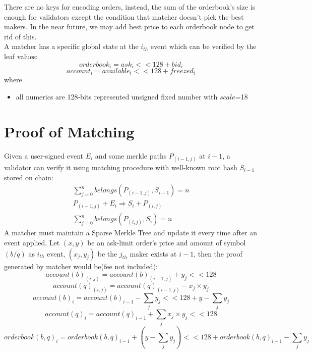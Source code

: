 \documentclass[a4paper,12pt]{article}
\begin{document}
There are no keys for encoding orders, instead, the sum of the orderbook's size is enough for validators except the condition that matcher doesn't pick the best makers. In the near future, we may add best price to each orderbook node to get rid of this.\\
A matcher has a specific global state at the \(i_{th}\) event which can be verified by the leaf values:\\
\begin{equation*}
    orderbook_{i} = ask_{i} << 128 + bid_{i}
\end{equation*}
\begin{equation*}
    account_{i} = available_{i} << 128 + freezed_{i}
\end{equation*}
where\\
\begin{itemize}
    \item all numerics are 128-bits represented unsigned fixed number with $scale$=18
\end{itemize}
\section{Proof of Matching}
\label{sec:org48d64ef}
Given a user-signed event \(E_{i}\) and some merkle paths \(P_{(i-1, j)}\) at \(i-1\), a validator can verify it using matching procedure with well-known root hash \(S_{i-1}\) stored on chain:\\
\begin{eqnarray*}
\sum\limits_{j=0}^{n} belongs(P_{(i-1, j)}, S_{i-1}) = n\\
P_{(i-1, j)} + E_{i} \Rightarrow S_{i} + P_{(i, j)} \\
\sum\limits_{j=0}^{n} belongs(P_{(i, j)}, S_{i}) = n
\end{eqnarray*}
A matcher must maintain a Sparse Merkle Tree and update it every time after an event applied. Let \((x, y)\) be an ask-limit order's price and amount of symbol \((b/q)\) as \(i_{th}\) event, \((x_{j}, y_{j})\) be the \(j_{th}\) maker exists at \(i-1\), then the proof generated by matcher would be(fee not included):\\
\begin{equation*}
    account(b)_{(i, j)}=account(b)_{(i-1,j)} + y_{j} << 128
\end{equation*}
\begin{equation*}
    account(q)_{(i, j)}=account(q)_{(i-1,j)} - x_{j} \times y_{j}
\end{equation*}
\begin{equation*}
    account(b)_{i}=account(b)_{i-1} - \sum\limits_{j} y_{j} << 128 + y - \sum\limits_{j} y_{j}
\end{equation*}
\begin{equation*}
    account(q)_{i}=account(q)_{i-1} + \sum\limits_{j} x_{j} \times y_{j} << 128
\end{equation*}
\begin{equation*}
    orderbook(b,q)_{i}=orderbook(b,q)_{i-1} + (y - \sum\limits_{j} y_{j}) << 128 + orderbook(b,q)_{i-1} - \sum\limits_{j} y_{j}
\end{equation*}
\end{document}
